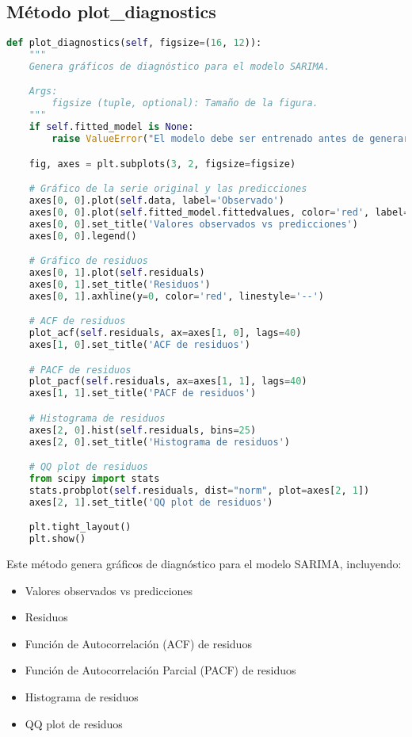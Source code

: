 \documentclass[12pt,letterpaper]{report}
\begin{document}
\subsection{Método plot\_diagnostics}
\begin{lstlisting}[language=python]
def plot_diagnostics(self, figsize=(16, 12)):
    """
    Genera gráficos de diagnóstico para el modelo SARIMA.

    Args:
        figsize (tuple, optional): Tamaño de la figura.
    """
    if self.fitted_model is None:
        raise ValueError("El modelo debe ser entrenado antes de generar diagnósticos")

    fig, axes = plt.subplots(3, 2, figsize=figsize)

    # Gráfico de la serie original y las predicciones
    axes[0, 0].plot(self.data, label='Observado')
    axes[0, 0].plot(self.fitted_model.fittedvalues, color='red', label='Predicciones')
    axes[0, 0].set_title('Valores observados vs predicciones')
    axes[0, 0].legend()

    # Gráfico de residuos
    axes[0, 1].plot(self.residuals)
    axes[0, 1].set_title('Residuos')
    axes[0, 1].axhline(y=0, color='red', linestyle='--')

    # ACF de residuos
    plot_acf(self.residuals, ax=axes[1, 0], lags=40)
    axes[1, 0].set_title('ACF de residuos')

    # PACF de residuos
    plot_pacf(self.residuals, ax=axes[1, 1], lags=40)
    axes[1, 1].set_title('PACF de residuos')

    # Histograma de residuos
    axes[2, 0].hist(self.residuals, bins=25)
    axes[2, 0].set_title('Histograma de residuos')

    # QQ plot de residuos
    from scipy import stats
    stats.probplot(self.residuals, dist="norm", plot=axes[2, 1])
    axes[2, 1].set_title('QQ plot de residuos')

    plt.tight_layout()
    plt.show()
\end{lstlisting}

Este método genera gráficos de diagnóstico para el modelo SARIMA, incluyendo:
\begin{itemize}
    \item Valores observados vs predicciones
    \item Residuos
    \item Función de Autocorrelación (ACF) de residuos
    \item Función de Autocorrelación Parcial (PACF) de residuos
    \item Histograma de residuos
    \item QQ plot de residuos
\end{itemize}
\end{document}
